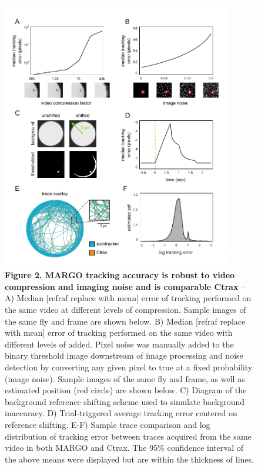 \documentclass[10pt]{article}
\begin{document}
\newpage
\begin{figure}[h!]
	\begin{center}
		\includegraphics[width=0.9\textwidth]{../figures/autotracker_performance.pdf}
	\end{center}
	\caption*{\footnotesize \textbf{Figure 2. MARGO tracking accuracy is robust to video compression and imaging noise and is comparable Ctrax} -- A) Median [refraf replace with mean] error of tracking performed on the same video at different levels of compression. Sample images of the same fly and frame are shown below. B) Median [refraf replace with mean] error of tracking performed on the same video with different levels of added. Pixel noise was manually added to the binary threshold image downstream of image processing and noise detection by converting any given pixel to true at a fixed probability (image noise). Sample images of the same fly and frame, as well as estimated position (red circle) are shown below. C) Diagram of the background reference shifting scheme used to simulate background inaccuracy. D) Trial-triggered average tracking error centered on reference shifting. E-F) Sample trace comparison and log distribution of tracking error between traces acquired from the same video in both MARGO and Ctrax. The 95\% confidence interval of the above means were displayed but are within the thickness of lines.}
\end{figure}
\end{document}
